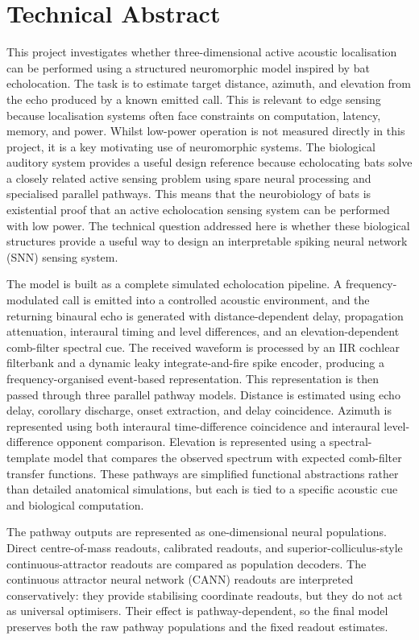 \chapter*{Technical Abstract}

This project investigates whether three-dimensional active acoustic localisation can be performed using a structured neuromorphic model inspired by bat echolocation. The task is to estimate target distance, azimuth, and elevation from the echo produced by a known emitted call. This is relevant to edge sensing because localisation systems often face constraints on computation, latency, memory, and power. Whilst low-power operation is not measured directly in this project, it is a key motivating use of neuromorphic systems. The biological auditory system provides a useful design reference because echolocating bats solve a closely related active sensing problem using spare neural processing and specialised parallel pathways. This means that the neurobiology of bats is existential proof that an active echolocation sensing system can be performed with low power. The technical question addressed here is whether these biological structures provide a useful way to design an interpretable spiking neural network (SNN) sensing system.

The model is built as a complete simulated echolocation pipeline. A frequency-modulated call is emitted into a controlled acoustic environment, and the returning binaural echo is generated with distance-dependent delay, propagation attenuation, interaural timing and level differences, and an elevation-dependent comb-filter spectral cue. The received waveform is processed by an IIR cochlear filterbank and a dynamic leaky integrate-and-fire spike encoder, producing a frequency-organised event-based representation. This representation is then passed through three parallel pathway models. Distance is estimated using echo delay, corollary discharge, onset extraction, and delay coincidence. Azimuth is represented using both interaural time-difference coincidence and interaural level-difference opponent comparison. Elevation is represented using a spectral-template model that compares the observed spectrum with expected comb-filter transfer functions. These pathways are simplified functional abstractions rather than detailed anatomical simulations, but each is tied to a specific acoustic cue and biological computation.

The pathway outputs are represented as one-dimensional neural populations. Direct centre-of-mass readouts, calibrated readouts, and superior-colliculus-style continuous-attractor readouts are compared as population decoders. The continuous attractor neural network (CANN) readouts are interpreted conservatively: they provide stabilising coordinate readouts, but they do not act as universal optimisers. Their effect is pathway-dependent, so the final model preserves both the raw pathway populations and the fixed readout estimates.

